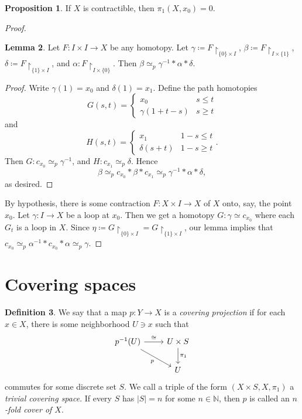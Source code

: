 \documentclass[10pt,letterpaper,cm]{nupset}
\theoremstyle{definition}
\newtheorem{definition}{Definition}[subsection]
\theoremstyle{theorem}
\newtheorem{lemma}[definition]{Lemma}
\newtheorem{prop}[definition]{Proposition}
\theoremstyle{remark}
\newcommand{\N}{\mathbb N}
\newcommand{\1}{\mathbb{1}}
\newcommand{\0}{\vec 0}
\begin{document}
\begin{prop}
If $X$ is contractible, then $\pi_1(X, x_0) = 0$.
\end{prop}
\begin{proof}
\begin{lemma}
Let $F: I \times I \to X$ be  any homotopy. Let $\gamma \coloneqq  F\restriction_{\{0\} \times I}$, $\beta \coloneqq  F\restriction_{I \times \{1\}}$, $\delta \coloneqq  F\restriction_{\{1\} \times I}$, and $\alpha : F \restriction_{I \times \{0\}}$. Then $\beta \simeq_p \gamma^{-1} \ast \alpha \ast \delta$. 
\end{lemma}
\begin{proof} Write $\gamma(1) = x_0$ and $\delta(1) = x_1$. Define the path homotopies $$G(s,t) = \begin{cases} x_0 & s\leq t \\ \gamma(1 + t-s) & s \geq t   \end{cases}$$ and $$H(s,t) = \begin{cases}  x_1 & 1-s \leq t \\ \delta(s+t) & 1-s \geq t  \end{cases} .$$ Then $G: c_{x_0} \simeq_p \gamma^{-1}$, and $H: c_{x_1} \simeq_p \delta$. Hence $$\beta \simeq_p c_{x_0} \ast \beta \ast c_{x_1} \simeq_p \gamma^{-1} \ast \alpha \ast \delta, $$ as desired. 
\end{proof}
By hypothesis, there is some contraction $F: X \times I \to X$ of $X$ onto, say, the point $x_0$. Let $\gamma : I \to X$ be a loop at $x_0$. Then we get a homotopy $G: \gamma \simeq c_{x_0}$ where each $G_t$ is a loop in $X$. Since $\eta \coloneqq  G\restriction_{\{0\} \times I} = G \restriction_{\{1\} \times I}$, our lemma implies that $c_{x_0} \simeq_p \alpha^{-1} \ast c_{x_0} \ast \alpha \simeq_p \gamma$. 
\end{proof}


\section{Covering spaces} 

\begin{definition}
We say that a map $p: Y \to X$ is a \textit{covering projection} if for each $x\in X$, there is some neighborhood $U\ni x$ such that 
\[
\begin{tikzcd}
p^{-1}(U) \arrow[rd, "p"'] \arrow[r, "\cong"] & U \times S \arrow[d, "\pi_1"] \\
 & U
\end{tikzcd}
\] commutes for some discrete set $S$. We call a triple of the form $(X \times S, X, \pi_1)$ a \textit{trivial covering space}. If every $S$ has $|S| = n$ for some $n\in \N$, then $p$ is called an \textit{$n$-fold cover of $X$}.
\end{definition}
\end{document}
